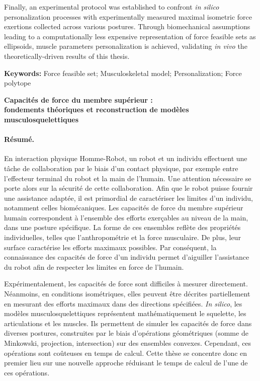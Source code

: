 Finally, an experimental protocol was established to confront \emph{in silico} personalization processes with experimentally measured maximal isometric force exertions collected across various postures. Through biomechanical assumptions leading to a computationally less expensive representation of force feasible sets as ellipsoids, muscle parameters personalization is achieved, validating \emph{in vivo} the theoretically-driven results of this thesis.

\textbf{Keywords:} Force feasible set; Musculoskeletal model; Personalization; Force polytope

\clearpage
\begin{center}
    \textbf{Capacités de force du membre supérieur :}\\
    \textbf{fondements théoriques et reconstruction de modèles musculosquelettiques}
\end{center}
\paragraph*{Résumé.} En interaction physique Homme-Robot, un robot et un individu effectuent une tâche de collaboration par le biais d'un contact physique, par exemple entre l'effecteur terminal du robot et la main de l'humain. Une attention nécessaire se porte alors sur la sécurité de cette collaboration. Afin que le robot puisse fournir une assistance adaptée, il est primordial de caractériser les limites d'un individu, notamment celles biomécaniques. Les capacités de force du membre supérieur humain correspondent à l'ensemble des efforts exerçables au niveau de la main, dans une posture spécifique. La forme de ces ensembles reflète des propriétés individuelles, telles que l'anthropométrie et la force musculaire. De plus, leur surface caractérise les efforts maximaux possibles. Par conséquent, la connaissance des capacités de force d'un individu permet d'aiguiller l'assistance du robot afin de respecter les limites en force de l'humain.

Expérimentalement, les capacités de force sont difficiles à mesurer directement. Néanmoins, en conditions isométriques, elles peuvent être décrites partiellement en mesurant des efforts maximaux dans des directions spécifiées. \emph{In silico}, les modèles musculosquelettiques représentent mathématiquement le squelette, les articulations et les muscles. Ils permettent de simuler les capacités de force dans diverses postures, construites par le biais d'opérations géométriques (somme de Minkowski, projection, intersection) sur des ensembles convexes. Cependant, ces opérations sont coûteuses en temps de calcul. Cette thèse se concentre donc en premier lieu sur une nouvelle approche réduisant le temps de calcul de l'une de ces opérations.

